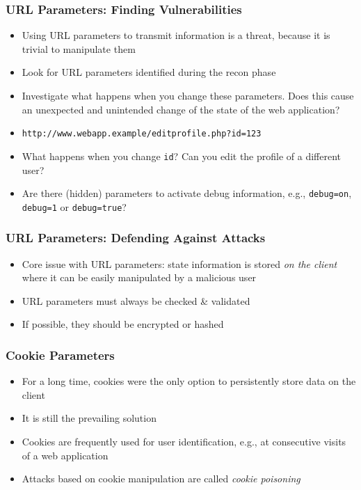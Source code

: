 \begin{frame}[fragile]
    \frametitle{URL Parameters: Finding Vulnerabilities}
    \begin{itemize}
        \item Using URL parameters to transmit information is a threat, because it is trivial to manipulate them
        \item Look for URL parameters identified during the recon phase
        \item Investigate what happens when you change these parameters. Does this cause an unexpected and unintended change of the state of the web application?
        \item \verb|http://www.webapp.example/editprofile.php?id=123|
        \item What happens when you change \verb|id|? Can you edit the profile of a different user?
        \item Are there (hidden) parameters to activate debug information, e.g., \verb|debug=on|, \verb|debug=1| or \verb|debug=true|?
    \end{itemize}
\end{frame}

\begin{frame}
    \frametitle{URL Parameters: Defending Against Attacks}
    \begin{itemize}
        \item Core issue with URL parameters: state information is stored \textit{on the client} where it can be easily manipulated by a malicious user
        \item URL parameters must always be checked \& validated
        \item If possible, they should be encrypted or hashed
    \end{itemize}
\end{frame}

\begin{frame}
    \frametitle{Cookie Parameters}
    \begin{itemize}
        \item For a long time, cookies were the only option to persistently store data on the client
        \item It is still the prevailing solution
        \item Cookies are frequently used for user identification, e.g., at consecutive visits of a web application
        \item Attacks based on cookie manipulation are called \textit{cookie poisoning}  
    \end{itemize}
\end{frame}

